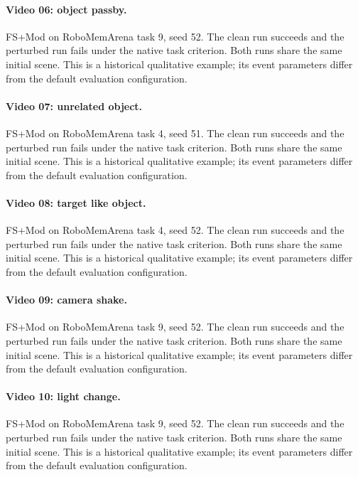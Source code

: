 \paragraph{Video 06: object passby.} FS+Mod on RoboMemArena task 9, seed 52. The clean run succeeds and the perturbed run fails under the native task criterion. Both runs share the same initial scene. This is a historical qualitative example; its event parameters differ from the default evaluation configuration.

\paragraph{Video 07: unrelated object.} FS+Mod on RoboMemArena task 4, seed 51. The clean run succeeds and the perturbed run fails under the native task criterion. Both runs share the same initial scene. This is a historical qualitative example; its event parameters differ from the default evaluation configuration.

\paragraph{Video 08: target like object.} FS+Mod on RoboMemArena task 4, seed 52. The clean run succeeds and the perturbed run fails under the native task criterion. Both runs share the same initial scene. This is a historical qualitative example; its event parameters differ from the default evaluation configuration.

\paragraph{Video 09: camera shake.} FS+Mod on RoboMemArena task 9, seed 52. The clean run succeeds and the perturbed run fails under the native task criterion. Both runs share the same initial scene. This is a historical qualitative example; its event parameters differ from the default evaluation configuration.

\paragraph{Video 10: light change.} FS+Mod on RoboMemArena task 9, seed 52. The clean run succeeds and the perturbed run fails under the native task criterion. Both runs share the same initial scene. This is a historical qualitative example; its event parameters differ from the default evaluation configuration.

